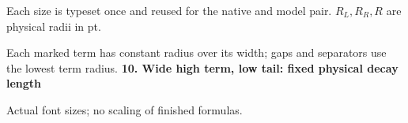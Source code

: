 \documentclass{article}
\newcommand\High{\frac{\displaystyle\sum_{k=1}^n x_k}{1+\frac pq}}
\newcommand\Mark[1]{\directlua{grid.mark(#1)}}
\begin{document}
\par\medskip
Each size is typeset once and reused for the native and model pair. $R_L,R_R,R$ are physical radii in pt.\par
Each marked term has constant radius over its width; gaps and separators use the lowest term radius.
\newpage
{\Large\bfseries 10. Wide high term, low tail: fixed physical decay length}\par\medskip
{} Actual font sizes; no scaling of finished formulas.\par\medskip
\end{document}
